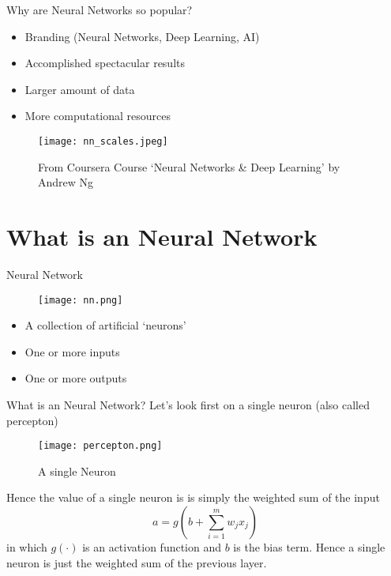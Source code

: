 \documentclass{beamer}
\begin{document}
\begin{frame}[t]{Why are Neural Networks so popular?}
  \begin{itemize}
    \item Branding (Neural Networks, Deep Learning, AI)
    \item Accomplished spectacular results
    \item Larger amount of data
    \item More computational resources
  \end{itemize}
  \begin{figure}[htpb]
    \centering
    \texttt{[image: nn\_scales.jpeg]}
    \caption{\tiny From Coursera Course `Neural Networks \& Deep Learning' by Andrew Ng}
  \end{figure}
\end{frame}

\section{What is an Neural Network}

\begin{frame}[t]{Neural Network}
  \begin{figure}[htpb]
    \centering
    \texttt{[image: nn.png]}
  \end{figure}
  \begin{itemize}
    \item A collection of artificial `neurons'
    \item One or more inputs 
    \item One or more outputs
  \end{itemize}
\end{frame}

\begin{frame}[t]{What is an Neural Network?}
  \small
  Let's look first on a single neuron (also called percepton)
  \begin{figure}[htpb]
    \centering
    \texttt{[image: percepton.png]}
    \caption{A single Neuron}
  \end{figure}
  Hence the value of a single neuron is is simply the weighted sum of the input
  \begin{equation}
   a = g(b + \sum^m_{i=1} w_j x_j)
  \end{equation}
  in which $g(\cdot)$ is an activation function and $b$ is the bias term.
  Hence a single neuron is just the weighted sum of the previous layer.
\end{frame}
\end{document}
